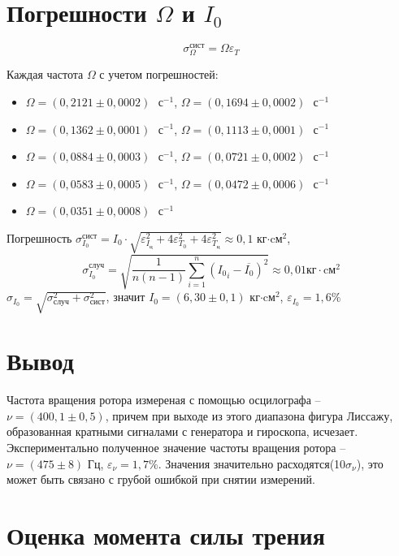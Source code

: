 \documentclass[a4paper,14pt]{extarticle}
\begin{document}
	\section{Погрешности $\Omega$ и $I_0$}
	
	\begin{equation}
		 \sigma_\Omega^\text{сист} = \Omega \varepsilon_T 
	\end{equation}
	
	Каждая частота $\Omega$ с учетом погрешностей:
	\begin{itemize}
		\item $\Omega = (0,2121\pm 0,0002)\text{ }\text{с}^{-1}$,  $\Omega = (0,1694 \pm 0,0002)\text{ }\text{с}^{-1}$
		\item $\Omega = (0,1362 \pm 0,0001)\text{ }\text{с}^{-1}$,  $\Omega = (0,1113 \pm 0,0001)\text{ }\text{с}^{-1}$
		\item $\Omega = (0,0884 \pm 0,0003)\text{ }\text{с}^{-1}$,  $\Omega = (0,0721 \pm 0,0002)\text{ }\text{с}^{-1}$
		\item $\Omega = (0,0583 \pm 0,0005)\text{ }\text{с}^{-1}$,  $\Omega = (0,0472 \pm 0,0006)\text{ }\text{с}^{-1}$
		\item $\Omega = (0,0351 \pm 0,0008)\text{ }\text{с}^{-1}$
	\end{itemize}
	
	Погрешность $\sigma_{I_0}^\text{сист} = I_0\cdot\sqrt{\varepsilon_{I_\text{ц}}^2+ 4\varepsilon_{T_0}^2+ 4\varepsilon_{T_\text{ц}}^2 } \approx 0,1$ кг$\cdot \text{cм}^2$,\\ $$\sigma_{I_0}^\text{случ}=  \sqrt{\frac{1}{n(n-1)} \sum_{i=1}^{n}({I_0}_i - \overline{{I_0}})^2} \approx 0,01 \text{кг}\cdot \text{cм}^2$$  
	$\sigma_{I_0} = \sqrt{ \sigma_\text{случ}^2 + \sigma_\text{сист}^2}$,   значит $I_0 = (6,30\pm 0,1)$ кг$\cdot \text{cм}^2$, $\varepsilon_{I_0} = 1,6\%$
	
\section{Вывод}
	Частота вращения ротора измереная с помощью осцилографа  -- $\nu = (400,1 \pm 0,5)	$, причем при выходе из этого диапазона фигура Лиссажу, образованная кратными сигналами с генератора и гироскопа, исчезает. Экспериментально полученное значение частоты вращения ротора -- $\nu = (475 \pm 8)\text{ Гц} $, $\varepsilon_{\nu} = 1,7\%$. Значения значительно расходятся(10$\sigma_\nu$), это может быть связано с грубой ошибкой при снятии измерений. 
\section{Оценка момента силы трения}
\end{document}
